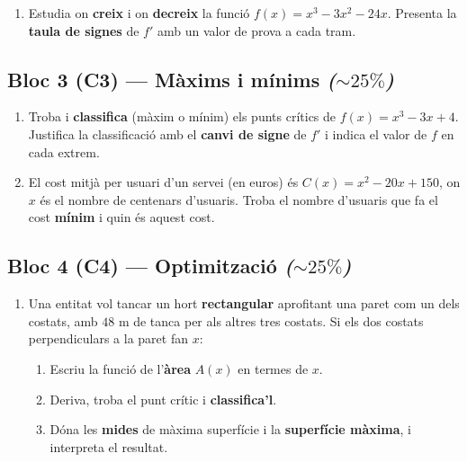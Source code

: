 \begin{enumerate}[label=\textbf{\arabic*.}, leftmargin=2em, itemsep=7pt, start=2]
  \item Estudia on \textbf{creix} i on \textbf{decreix} la funció
        $f(x)=x^3-3x^2-24x$. Presenta la \textbf{taula de signes} de $f'$ amb un valor
        de prova a cada tram.
\end{enumerate}

\subsection*{Bloc 3 (C3) — Màxims i mínims \hfill \normalfont\itshape ($\sim 25\%$)}

\begin{enumerate}[label=\textbf{\arabic*.}, leftmargin=2em, itemsep=7pt, start=3]
  \item Troba i \textbf{classifica} (màxim o mínim) els punts crítics de
        $f(x)=x^3-3x+4$. Justifica la classificació amb el \textbf{canvi de signe} de
        $f'$ i indica el valor de $f$ en cada extrem.
  \item El cost mitjà per usuari d'un servei (en euros) és $C(x)=x^2-20x+150$, on $x$
        és el nombre de centenars d'usuaris. Troba el nombre d'usuaris que fa el cost
        \textbf{mínim} i quin és aquest cost.
\end{enumerate}

\subsection*{Bloc 4 (C4) — Optimització \hfill \normalfont\itshape ($\sim 25\%$)}

\begin{enumerate}[label=\textbf{\arabic*.}, leftmargin=2em, itemsep=7pt, start=5]
  \item Una entitat vol tancar un hort \textbf{rectangular} aprofitant una paret com un
        dels costats, amb $48$ m de tanca per als altres tres costats. Si els dos
        costats perpendiculars a la paret fan $x$:
        \begin{enumerate}[label=\alph*), leftmargin=1.6em, topsep=2pt, itemsep=2pt]
          \item Escriu la funció de l'\textbf{àrea} $A(x)$ en termes de $x$.
          \item Deriva, troba el punt crític i \textbf{classifica'l}.
          \item Dóna les \textbf{mides} de màxima superfície i la \textbf{superfície
                màxima}, i interpreta el resultat.
        \end{enumerate}
\end{enumerate}

